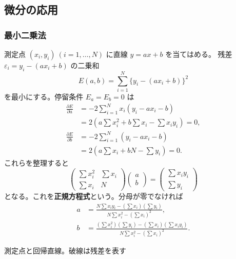 \subsection{微分の応用}

\subsubsection{最小二乗法}

測定点 $(x_i,y_i)\ (i=1,\ldots,N)$ に直線 $y=ax+b$ を当てはめる。
残差 $\varepsilon_i=y_i-(ax_i+b)$ の二乗和
\[
 E(a,b)=\sum_{i=1}^N\{y_i-(ax_i+b)\}^2
\]
を最小にする。停留条件 $E_a=E_b=0$ は
\begin{align*}
 \frac{\partial E}{\partial a}
 &=-2\sum_{i=1}^Nx_i(y_i-ax_i-b)\\
 &=2\left(a\sum x_i^2+b\sum x_i-\sum x_iy_i\right)=0,\\
 \frac{\partial E}{\partial b}
 &=-2\sum_{i=1}^N(y_i-ax_i-b)\\
 &=2\left(a\sum x_i+bN-\sum y_i\right)=0.
\end{align*}
これらを整理すると
\begin{equation}
 \begin{pmatrix}
  \sum x_i^2&\sum x_i\\ \sum x_i&N
 \end{pmatrix}
 \begin{pmatrix}a\\b\end{pmatrix}
 =
 \begin{pmatrix}\sum x_iy_i\\\sum y_i\end{pmatrix}
\end{equation}
となる。これを\textbf{正規方程式}という。分母が零でなければ
\begin{align}
 a&=\frac{N\sum x_iy_i-(\sum x_i)(\sum y_i)}
 {N\sum x_i^2-(\sum x_i)^2},\\
 b&=\frac{(\sum x_i^2)(\sum y_i)-(\sum x_i)(\sum x_iy_i)}
 {N\sum x_i^2-(\sum x_i)^2}.
\end{align}

\begin{center}

\small 測定点と回帰直線。破線は残差を表す
\end{center}

